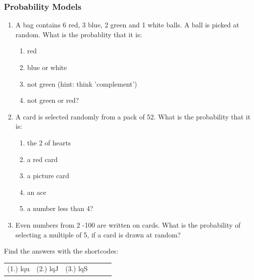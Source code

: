 \label{m39377*secfhsst!!!underscore!!!id343}
            \subsubsection{  Probability Models
}
            \nopagebreak
            
        \label{m39377*id112273}\begin{enumerate}[noitemsep, label=\textbf{\arabic*}. ] 
            \label{m39377*uid42}\item A bag contains 6 red, 3 blue, 2 green and 1 white balls. A ball is
picked at random. What is the probablity that it is:
\label{m39377*id112289}\begin{enumerate}[noitemsep, label=\textbf{\alph*}. ] 
            \label{m39377*uid43}\item red
\label{m39377*uid44}\item blue or white
\label{m39377*uid45}\item not green (hint: think 'complement')
\label{m39377*uid46}\item not green or red?
\end{enumerate}
                \label{m39377*uid47}\item A card is selected randomly from a pack of 52. What
is the probability that it is:
\label{m39377*id112354}\begin{enumerate}[noitemsep, label=\textbf{\alph*}. ] 
            \label{m39377*uid48}\item the 2 of hearts
\label{m39377*uid49}\item a red card
\label{m39377*uid50}\item a picture card
\label{m39377*uid51}\item an ace
\label{m39377*uid52}\item a number less than 4?
\end{enumerate}
                \label{m39377*uid53}\item Even numbers from 2 -100 are written on cards. What
is the probability of selecting a multiple of 5, if a card is drawn at
random?\newline
            
\end{enumerate}
        
        


    
  \label{m39377*cid7}
\par {} Find the answers with the shortcodes:
 \par \begin{tabular}[h]{cccccc}
 (1.) lqu  &  (2.) lqJ  &  (3.) lqS  & \end{tabular}



